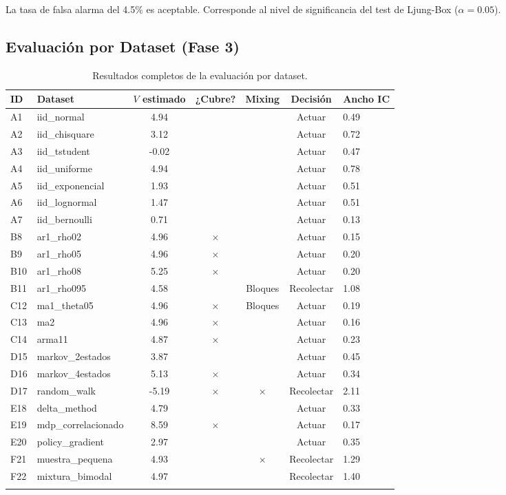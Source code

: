 \documentclass[12pt,a4paper]{article}
\newcommand{\ok}{\textcolor{cbgreen}{\checkmark}}
\newcommand{\fail}{\textcolor{cbred}{$\times$}}
\begin{document}
La tasa de falsa alarma del 4.5\% es aceptable. Corresponde al nivel de significancia del test de Ljung-Box ($\alpha = 0.05$).

\subsection{Evaluación por Dataset (Fase 3)}

\begin{longtable}{@{}llccccl@{}}
    \toprule
    ID & Dataset & $V$ estimado & ¿Cubre? & Mixing & Decisión & Ancho IC \\
    \midrule
    \endhead
    A1 & iid\_normal & 4.94 & \ok & \ok & Actuar & 0.49 \\
    A2 & iid\_chisquare & 3.12 & \ok & \ok & Actuar & 0.72 \\
    A3 & iid\_tstudent & -0.02 & \ok & \ok & Actuar & 0.47 \\
    A4 & iid\_uniforme & 4.94 & \ok & \ok & Actuar & 0.78 \\
    A5 & iid\_exponencial & 1.93 & \ok & \ok & Actuar & 0.51 \\
    A6 & iid\_lognormal & 1.47 & \ok & \ok & Actuar & 0.51 \\
    A7 & iid\_bernoulli & 0.71 & \ok & \ok & Actuar & 0.13 \\
    B8 & ar1\_rho02 & 4.96 & \fail & \ok & Actuar & 0.15 \\
    B9 & ar1\_rho05 & 4.96 & \fail & \ok & Actuar & 0.20 \\
    B10 & ar1\_rho08 & 5.25 & \fail & \ok & Actuar & 0.20 \\
    B11 & ar1\_rho095 & 4.58 & \ok & Bloques & Recolectar & 1.08 \\
    C12 & ma1\_theta05 & 4.96 & \fail & Bloques & Actuar & 0.19 \\
    C13 & ma2 & 4.96 & \fail & \ok & Actuar & 0.16 \\
    C14 & arma11 & 4.87 & \fail & \ok & Actuar & 0.23 \\
    D15 & markov\_2estados & 3.87 & \ok & \ok & Actuar & 0.45 \\
    D16 & markov\_4estados & 5.13 & \fail & \ok & Actuar & 0.34 \\
    D17 & random\_walk & -5.19 & \fail & \fail & Recolectar & 2.11 \\
    E18 & delta\_method & 4.79 & \ok & \ok & Actuar & 0.33 \\
    E19 & mdp\_correlacionado & 8.59 & \fail & \ok & Actuar & 0.17 \\
    E20 & policy\_gradient & 2.97 & \ok & \ok & Actuar & 0.35 \\
    F21 & muestra\_pequena & 4.93 & \ok & \fail & Recolectar & 1.29 \\
    F22 & mixtura\_bimodal & 4.97 & \ok & \ok & Recolectar & 1.40 \\
    \bottomrule
    \caption{Resultados completos de la evaluación por dataset.}
\end{longtable}
\end{document}
